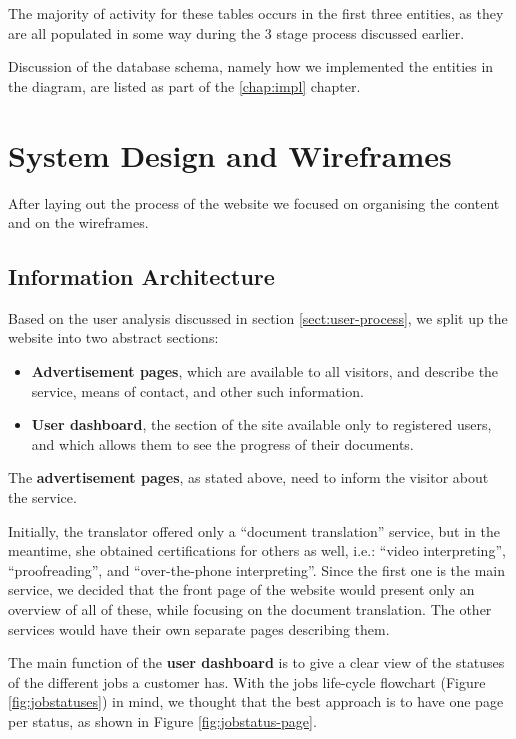 \documentclass{l3proj}
\begin{document}
The majority of activity for these tables occurs in the first three entities, as
they are all populated 
in some way during the 3 stage process discussed earlier.

Discussion of the database schema, namely how we implemented the entities in the
diagram, are listed as part of the \ref{chap:impl} chapter.


\section{System Design and Wireframes}
\label{sect:system-design-and-wireframes}
After laying out the process of the website we focused on organising the content
and on the wireframes.


\subsection{Information Architecture}
Based on the user analysis discussed in section \ref{sect:user-process}, we split
up the website into two abstract sections: 
\begin{itemize} 
	\item \textbf{Advertisement pages}, which are available to all visitors, and
	describe the service, means of contact, and other such information.
	\item \textbf{User dashboard}, the section of the site available only to
	registered users, and which allows them to see the progress of their 
	documents.
\end{itemize}

The \textbf{advertisement pages}, as stated above, need to inform the visitor
about the service. 

Initially, the translator offered only a ``document translation'' service, but
in the meantime, she obtained certifications for others as well, i.e.:
``video interpreting'', ``proofreading'', and ``over-the-phone interpreting''.
Since the first one is the main service, we decided that the front page of the
website would present only an overview of all of these, while focusing on the
document translation. The other services would have their own separate pages
describing them.

The main function of the \textbf{user dashboard} is to give a clear view of
the statuses of the different jobs a customer has. With the jobs life-cycle
flowchart (Figure \ref{fig:jobstatuses}) in mind, we thought that the best
approach is to have one page per status, as shown in Figure 
\ref{fig:jobstatus-page}.
\end{document}
